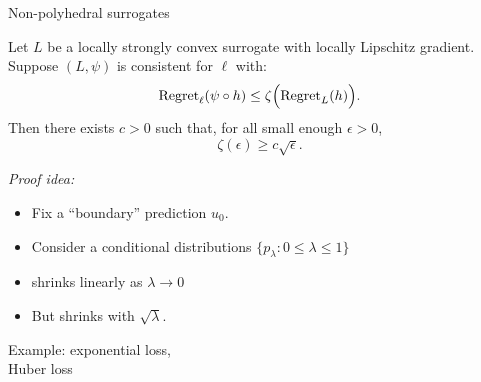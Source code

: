 \documentclass[t,mathserif,11pt,aspectratio=1610]{beamer}
\begin{document}
\begin{frame}{Non-polyhedral surrogates}{}
  \begin{theorem}
    Let $L$ be a locally strongly convex surrogate with locally Lipschitz gradient.
    Suppose $(L,\psi)$ is consistent for $\ell$ with:
    \[  \mathrm{Regret}_{\ell}(\psi \circ h) \leq \zeta\Big( \mathrm{Regret}_L(h) \Big) . \]
   Then there exists $c > 0$ such that, for all small enough $\epsilon > 0$,
    \[ \zeta(\epsilon) \geq c \sqrt{\epsilon} . \]
  \end{theorem}

  \pause
  \emph{Proof idea:}
  \begin{itemize}
    \item Fix a ``boundary'' prediction $u_0$.
    \item Consider a conditional distributions $\{p_{\lambda} : 0 \leq \lambda \leq 1\}$
    \item {} shrinks linearly as $\lambda \to 0$
    \item But  shrinks with $\sqrt{\lambda}$.
  \end{itemize}

  \pause
  Example: exponential loss,    \\
  Huber loss                  
\end{frame}

\begin{frame}{}{}
  \vfill
  {\Large
  } %
  \vfill
\end{frame}
\end{document}
